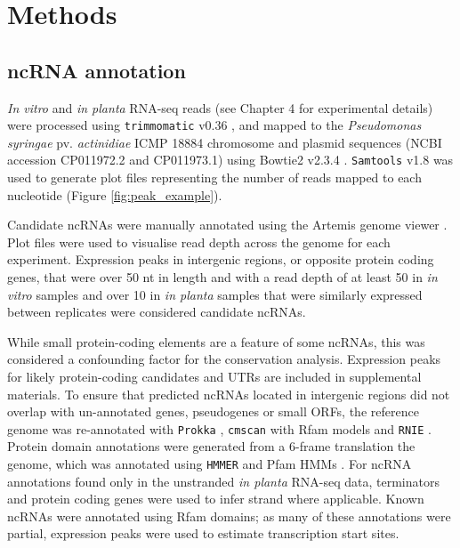 \section{Methods}

\subsection{ncRNA annotation}

\textit{In vitro} and \textit{in planta} RNA-seq reads (see Chapter 4 for experimental details) were processed using \texttt{trimmomatic} v0.36 \citep{Bolger_Usadel_2014x}, and mapped to the \textit{Pseudomonas syringae} pv. \textit{actinidiae} ICMP 18884 chromosome and plasmid sequences (NCBI accession CP011972.2 and CP011973.1) \citep{Templeton2015-mx} using Bowtie2 v2.3.4 \citep{Langmead2012x}. \texttt{Samtools} v1.8 \citep{Li_Handsaker_Wysoker_Fennellx} was used to generate plot files representing the number of reads mapped to each nucleotide (Figure \ref{fig:peak_example}). 

Candidate ncRNAs were manually annotated using the Artemis genome viewer \citep{Carver_Harris_Berriman_Parkhill_McQuillan_2012x}. 
Plot files were used to visualise read depth across the genome for each experiment. Expression peaks in intergenic regions, or opposite protein coding genes, that were over 50 nt in length and with a read depth of at least 50 in \textit{in vitro} samples and over 10 in \textit{in planta} samples that were similarly expressed between replicates were considered candidate ncRNAs. 

While small protein-coding elements are a feature of some ncRNAs, this was considered a confounding factor for the conservation analysis. Expression peaks for likely protein-coding candidates and UTRs are included in supplemental materials. To ensure that predicted ncRNAs located in intergenic regions did not overlap with un-annotated genes, pseudogenes or small ORFs, the reference genome was re-annotated with \texttt{Prokka} \citep{Seemann_2014x}, \texttt{cmscan} with Rfam models \citep{Nawrocki_Burge_Bateman_Daub_Eberhardt_Eddy_Floden_Gardner_Jones_Tate_2015x} and \texttt{RNIE} \citep{Gardner_Barquist_Bateman_Nawrocki_Weinberg_2011x}. Protein domain annotations were generated from a 6-frame translation the genome, which was annotated using \texttt{HMMER} \citep{Eddy2011-chi} and Pfam HMMs \citep{Punta_Coggill_2012x}. For ncRNA annotations found only in the unstranded \textit{in planta} RNA-seq data, terminators and protein coding genes were used to infer strand where applicable. Known ncRNAs were annotated using Rfam domains; as many of these annotations were partial, expression peaks were used to estimate transcription start sites.

